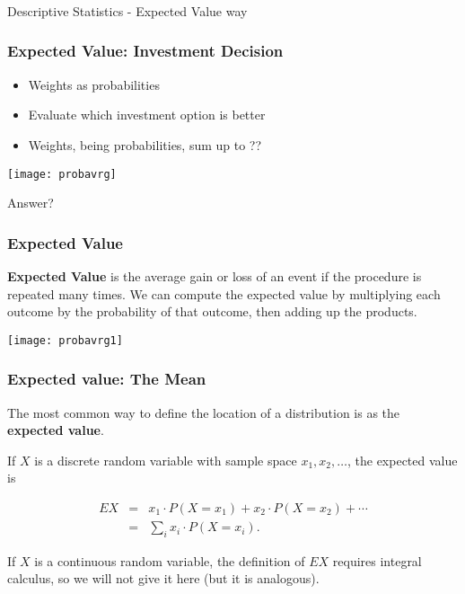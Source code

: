 \begin{frame}[fragile]\frametitle{}
\begin{center}
{\Large Descriptive Statistics - Expected Value way}
\end{center}
\end{frame}


\begin{frame}[fragile]\frametitle{Expected Value: Investment Decision}	
\begin{itemize}
\item Weights as probabilities
\item Evaluate which investment option is better
\item Weights, being probabilities, sum up to ??
\end{itemize}
\begin{center}
\texttt{[image: probavrg]}
\end{center}
Answer?
\end{frame}


\begin{frame}
\frametitle{Expected Value}

\begin{definition}
\textbf{Expected Value} is the average gain or loss of an event if the procedure is repeated many times.  We can compute the expected value by multiplying each outcome by the probability of that outcome, then adding up the products.
\end{definition}

\begin{center}
\texttt{[image: probavrg1]}
\end{center}
\end{frame}


\begin{frame}
\frametitle{Expected value: The Mean}

The most common way to define the location of a distribution is as the
{\bf expected value}.

If $X$ is a discrete random variable with sample space $x_1, x_2,
\ldots$, the expected value is

\begin{eqnarray*}
EX &=& x_1\cdot P(X=x_1) + x_2\cdot P(X=x_2) + \cdots\\ &=& \sum_i x_i
\cdot P(X=x_i).
\end{eqnarray*}

If $X$ is a continuous random variable, the definition of $EX$
requires integral calculus, so we will not give it here (but it is
analogous).

\end{frame}

